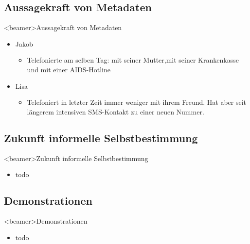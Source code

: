       \subsection{Aussagekraft von Metadaten}
    \begin{frame}<beamer>{Aussagekraft von Metadaten}
      \begin{itemize}
        \item Jakob
           \begin{itemize}
         \item Telefonierte am selben Tag: mit seiner Mutter,mit seiner Krankenkasse und mit einer AIDS-Hotline
      \end{itemize}
        \item Lisa
           \begin{itemize}
         \item Telefoniert in letzter Zeit immer weniger mit ihrem Freund. Hat aber seit längerem intensiven SMS-Kontakt zu einer neuen Nummer.
      \end{itemize}
      \end{itemize}
    \end{frame}
    
    
    

  \subsection{Zukunft informelle Selbstbestimmung}
    \begin{frame}<beamer>{Zukunft informelle Selbstbestimmung}
      \begin{itemize}
        \item
          todo
  

      \end{itemize}
    \end{frame}

  \subsection{Demonstrationen}
    \begin{frame}<beamer>{Demonstrationen}
      \begin{itemize}
        \item
          todo
  
      \end{itemize}
    \end{frame}
